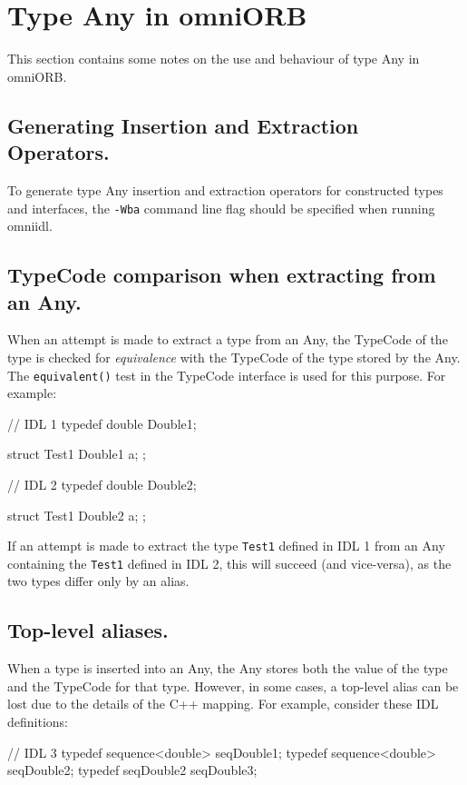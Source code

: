 \documentclass[11pt,twoside,a4paper]{book}
\newcommand{\type}[1]{\texttt{#1}}
\newcommand{\op}[1]{\texttt{#1()}}
\begin{document}
\section{Type Any in omniORB}
\label{anyOmniORB}

This section contains some notes on the use and behaviour of type Any
in omniORB.

\subsection{Generating Insertion and Extraction Operators.}
To generate type Any insertion and extraction operators for
constructed types and interfaces, the \texttt{-Wba} command line flag
should be specified when running omniidl.

\subsection{TypeCode comparison when extracting from an Any.}
When an attempt is made to extract a type from an Any, the TypeCode of
the type is checked for \emph{equivalence} with the TypeCode of the
type stored by the Any. The \op{equivalent} test in the TypeCode
interface is used for this purpose. For example:

\begin{idllisting}
// IDL 1
typedef double Double1;

struct Test1 {
  Double1 a;
};
\end{idllisting}

\begin{idllisting}
// IDL 2
typedef double Double2;

struct Test1 {
  Double2 a;
};
\end{idllisting}
    
If an attempt is made to extract the type \type{Test1} defined in IDL
1 from an Any containing the \type{Test1} defined in IDL 2, this will
succeed (and vice-versa), as the two types differ only by an alias.

\subsection{Top-level aliases.}
When a type is inserted into an Any, the Any stores both the value of
the type and the TypeCode for that type. However, in some cases, a
top-level alias can be lost due to the details of the C++ mapping. For
example, consider these IDL definitions:

\begin{idllisting}
// IDL 3
typedef sequence<double> seqDouble1;
typedef sequence<double> seqDouble2;
typedef seqDouble2       seqDouble3;
\end{idllisting}
\end{document}
